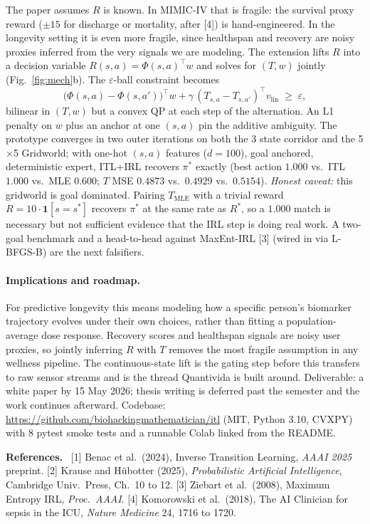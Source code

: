 \documentclass[11pt]{article}
\begin{document}
The paper assumes $R$ is known. In MIMIC-IV that is fragile: the survival proxy reward ($\pm 15$ for discharge or mortality, after [4]) is hand-engineered. In the longevity setting it is even more fragile, since healthspan and recovery are noisy proxies inferred from the very signals we are modeling. The extension lifts $R$ into a decision variable $R(s,a) = \Phi(s,a)^{\top} w$ and solves for $(T, w)$ jointly (Fig.~\ref{fig:mech}b). The $\varepsilon$-ball constraint becomes
\begin{equation*}
\bigl(\Phi(s,a) {-} \Phi(s,a')\bigr)^{\top} w {+} \gamma\,(T_{s,a} {-} T_{s,a'})^{\top} v_{\mathrm{lin}} \;\ge\; \varepsilon,
\end{equation*}
bilinear in $(T, w)$ but a convex QP at each step of the alternation. An L1 penalty on $w$ plus an anchor at one $(s,a)$ pin the additive ambiguity. The prototype converges in two outer iterations on both the 3 state corridor and the 5$\times$5 Gridworld; with one-hot $(s,a)$ features ($d{=}100$), goal anchored, deterministic expert, ITL+IRL recovers $\pi^{*}$ exactly (best action $1.000$ vs.\ ITL $1.000$ vs.\ MLE $0.600$; $T$ MSE $0.4873$ vs.\ $0.4929$ vs.\ $0.5154$). \emph{Honest caveat:} this gridworld is goal dominated. Pairing $T_{\mathrm{MLE}}$ with a trivial reward $R{=}10\cdot\mathbf{1}[s{=}s^{*}]$ recovers $\pi^{*}$ at the same rate as $R^{*}$, so a $1.000$ match is necessary but not sufficient evidence that the IRL step is doing real work. A two-goal benchmark and a head-to-head against MaxEnt-IRL [3] (wired in via L-BFGS-B) are the next falsifiers.

\paragraph{Implications and roadmap.} For predictive longevity this means modeling how a specific person's biomarker trajectory evolves under their own choices, rather than fitting a population-average dose response. Recovery scores and healthspan signals are noisy user proxies, so jointly inferring $R$ with $T$ removes the most fragile assumption in any wellness pipeline. The continuous-state lift is the gating step before this transfers to raw sensor streams and is the thread Quantivida is built around. Deliverable: a white paper by 15 May 2026; thesis writing is deferred past the semester and the work continues afterward. Codebase: \url{https://github.com/biohackingmathematician/itl} (MIT, Python 3.10, CVXPY) with 8 pytest smoke tests and a runnable Colab linked from the README.

\vspace{-0.3em}
{\scriptsize \noindent\textbf{References.}\ %
%
[1] Benac et al.\ (2024), Inverse Transition Learning, \emph{AAAI 2025} preprint.\hspace{0.6em}%
[2] Krause and H\"ubotter (2025), \emph{Probabilistic Artificial Intelligence}, Cambridge Univ.\ Press, Ch.\ 10 to 12.\hspace{0.6em}%
[3] Ziebart et al.\ (2008), Maximum Entropy IRL, \emph{Proc.\ AAAI}.\hspace{0.6em}%
[4] Komorowski et al.\ (2018), The AI Clinician for sepsis in the ICU, \emph{Nature Medicine} 24, 1716 to 1720.\par}
\end{document}
